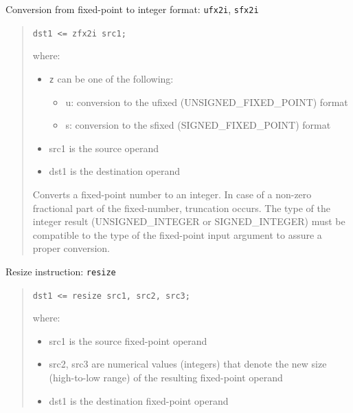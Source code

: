 \documentclass[a4paper]{article}
\begin{document}
Conversion from fixed-point to integer format: \texttt{ufx2i}, \texttt{sfx2i}
%
\begin{quote}

\texttt{dst1 <= zfx2i src1;}

where:
%
\begin{itemize}

\item \texttt{z} can be one of the following:
%
\begin{itemize}

\item u: conversion to the ufixed (UNSIGNED\_FIXED\_POINT) format

\item s: conversion to the sfixed (SIGNED\_FIXED\_POINT) format

\end{itemize}

\item src1 is the source operand

\item dst1 is the destination operand

\end{itemize}

Converts a fixed-point number to an integer. In case of a non-zero fractional part
of the fixed-number, truncation occurs. The type of the integer result (UNSIGNED\_INTEGER
or SIGNED\_INTEGER) must be compatible to the type of the fixed-point input argument
to assure a proper conversion.

\end{quote}

Resize instruction: \texttt{resize}
%
\begin{quote}

\texttt{dst1 <= resize src1, src2, src3;}

where:
%
\begin{itemize}

\item src1 is the source fixed-point operand

\item src2, src3 are numerical values (integers) that denote the new size (high-to-low range)
of the resulting fixed-point operand

\item dst1 is the destination fixed-point operand

\end{itemize}

\end{quote}
\end{document}

